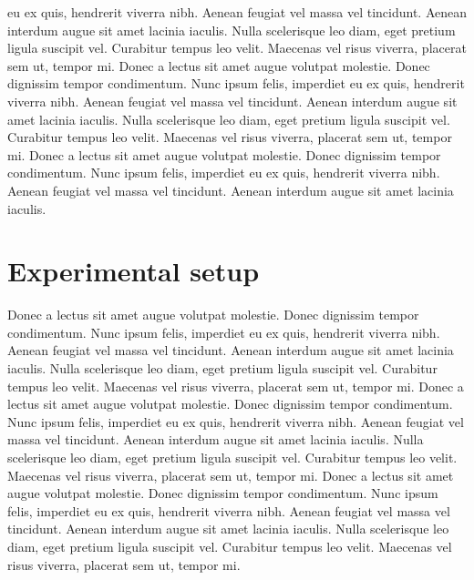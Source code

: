 \documentclass{article}
\begin{document}
eu ex quis, hendrerit viverra nibh. Aenean feugiat vel massa vel tincidunt. Aenean interdum augue sit amet lacinia
iaculis. Nulla scelerisque leo diam, eget pretium ligula suscipit vel. Curabitur tempus leo velit. Maecenas vel
risus viverra, placerat sem ut, tempor mi.
Donec a lectus sit amet augue volutpat molestie. Donec dignissim tempor condimentum. Nunc ipsum felis, imperdiet
eu ex quis, hendrerit viverra nibh. Aenean feugiat vel massa vel tincidunt. Aenean interdum augue sit amet lacinia
iaculis. Nulla scelerisque leo diam, eget pretium ligula suscipit vel. Curabitur tempus leo velit. Maecenas vel
risus viverra, placerat sem ut, tempor mi.
\vspace{5mm}
\newline
Donec a lectus sit amet augue volutpat molestie. Donec dignissim tempor condimentum. Nunc ipsum felis, imperdiet
eu ex quis, hendrerit viverra nibh. Aenean feugiat vel massa vel tincidunt. Aenean interdum augue sit amet
lacinia iaculis.

\section{Experimental setup}
Donec a lectus sit amet augue volutpat molestie. Donec dignissim tempor condimentum. Nunc ipsum felis, imperdiet
eu ex quis, hendrerit viverra nibh. Aenean feugiat vel massa vel tincidunt. Aenean interdum augue sit amet lacinia
iaculis. Nulla scelerisque leo diam, eget pretium ligula suscipit vel. Curabitur tempus leo velit. Maecenas vel
risus viverra, placerat sem ut, tempor mi.
\vspace{5mm}
\newline
Donec a lectus sit amet augue volutpat molestie. Donec dignissim tempor condimentum. Nunc ipsum felis, imperdiet
eu ex quis, hendrerit viverra nibh. Aenean feugiat vel massa vel tincidunt. Aenean interdum augue sit amet lacinia
iaculis. Nulla scelerisque leo diam, eget pretium ligula suscipit vel. Curabitur tempus leo velit. Maecenas vel
risus viverra, placerat sem ut, tempor mi.
\vspace{5mm}
\newline
Donec a lectus sit amet augue volutpat molestie. Donec dignissim tempor condimentum. Nunc ipsum felis, imperdiet
eu ex quis, hendrerit viverra nibh. Aenean feugiat vel massa vel tincidunt. Aenean interdum augue sit amet lacinia
iaculis. Nulla scelerisque leo diam, eget pretium ligula suscipit vel. Curabitur tempus leo velit. Maecenas vel
risus viverra, placerat sem ut, tempor mi.
\end{document}
